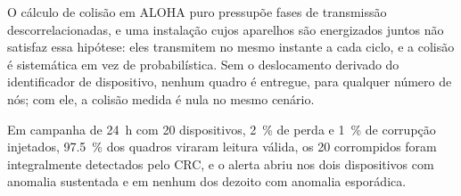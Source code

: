 \documentclass[10pt,a4paper,landscape,twocolumn]{article}
\begin{document}
O cálculo de colisão em ALOHA puro pressupõe fases de transmissão descorrelacionadas, e
uma instalação cujos aparelhos são energizados juntos não satisfaz essa hipótese: eles
transmitem no mesmo instante a cada ciclo, e a colisão é sistemática em vez de
probabilística. Sem o deslocamento derivado do identificador de dispositivo, nenhum quadro
é entregue, para qualquer número de nós; com ele, a colisão medida é nula no mesmo
cenário.

Em campanha de \SI{24}{\hour} com \num{20} dispositivos, \SI{2}{\percent} de perda e
\SI{1}{\percent} de corrupção injetados, \SI{97,5}{\percent} dos quadros viraram leitura
válida, os \num{20} corrompidos foram integralmente detectados pelo CRC, e o alerta abriu
nos dois dispositivos com anomalia sustentada e em nenhum dos dezoito com anomalia
esporádica.
\end{document}
